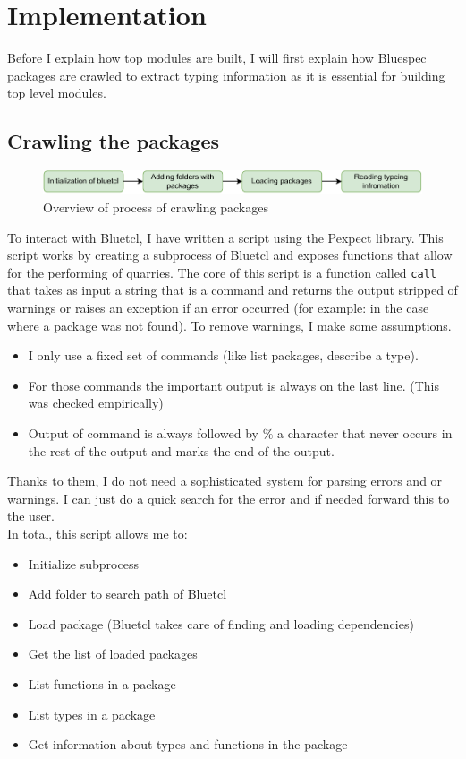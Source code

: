 \documentclass[12pt]{report}
\begin{document}
\chapter{Implementation}
Before I explain how top modules are built, I will first explain how Bluespec packages are crawled to extract typing information as it is essential for building top level modules. 
\section{Crawling the packages}
\begin{figure}[!h]
    \centering
    \caption{Overview of process of crawling packages}

    \includegraphics[width=1.0\columnwidth]{pdfExports/LargeMap-Crawling.drawio.pdf}
\end{figure}
To interact with Bluetcl, I have written a script using the Pexpect library. This script works by creating a subprocess of Bluetcl and exposes functions that allow for the performing of quarries. The core of this script is a function called \verb!call! that takes as input a string that is a command and returns the output stripped of warnings or raises an exception if an error occurred (for example: in the case where a package was not found). To remove warnings, I make some assumptions. 
\begin{itemize}
    \item I only use a fixed set of commands (like list packages, describe a type).  
    \item For those commands the important output is always on the last line. (This was checked empirically)   
    \item Output of command is always followed by $\%$ a character that never occurs in the rest of the output and marks the end of the output.  
\end{itemize}   
Thanks to them, I do not need a sophisticated system for parsing errors and or warnings. I can just do a quick search for the error and if needed forward this to the user.  
  \\   
In total, this script allows me to:   
\begin{itemize}   
\item Initialize subprocess   
\item Add folder to search path of Bluetcl   
\item Load package (Bluetcl takes care of finding and loading dependencies)   
\item Get the list of loaded packages   
\item List functions in a package   
\item List types in a package   
\item Get information about types and functions in the package   
\end{itemize} 
\end{document}
